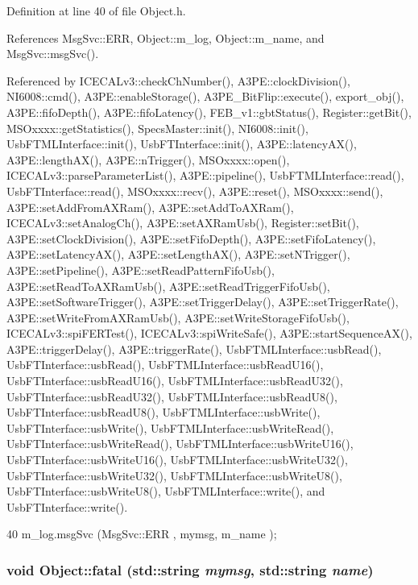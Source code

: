 Definition at line 40 of file Object.h.

References MsgSvc::ERR, Object::m\_\-log, Object::m\_\-name, and MsgSvc::msgSvc().

Referenced by ICECALv3::checkChNumber(), A3PE::clockDivision(), NI6008::cmd(), A3PE::enableStorage(), A3PE\_\-BitFlip::execute(), export\_\-obj(), A3PE::fifoDepth(), A3PE::fifoLatency(), FEB\_\-v1::gbtStatus(), Register::getBit(), MSOxxxx::getStatistics(), SpecsMaster::init(), NI6008::init(), UsbFTMLInterface::init(), UsbFTInterface::init(), A3PE::latencyAX(), A3PE::lengthAX(), A3PE::nTrigger(), MSOxxxx::open(), ICECALv3::parseParameterList(), A3PE::pipeline(), UsbFTMLInterface::read(), UsbFTInterface::read(), MSOxxxx::recv(), A3PE::reset(), MSOxxxx::send(), A3PE::setAddFromAXRam(), A3PE::setAddToAXRam(), ICECALv3::setAnalogCh(), A3PE::setAXRamUsb(), Register::setBit(), A3PE::setClockDivision(), A3PE::setFifoDepth(), A3PE::setFifoLatency(), A3PE::setLatencyAX(), A3PE::setLengthAX(), A3PE::setNTrigger(), A3PE::setPipeline(), A3PE::setReadPatternFifoUsb(), A3PE::setReadToAXRamUsb(), A3PE::setReadTriggerFifoUsb(), A3PE::setSoftwareTrigger(), A3PE::setTriggerDelay(), A3PE::setTriggerRate(), A3PE::setWriteFromAXRamUsb(), A3PE::setWriteStorageFifoUsb(), ICECALv3::spiFERTest(), ICECALv3::spiWriteSafe(), A3PE::startSequenceAX(), A3PE::triggerDelay(), A3PE::triggerRate(), UsbFTMLInterface::usbRead(), UsbFTInterface::usbRead(), UsbFTMLInterface::usbReadU16(), UsbFTInterface::usbReadU16(), UsbFTMLInterface::usbReadU32(), UsbFTInterface::usbReadU32(), UsbFTMLInterface::usbReadU8(), UsbFTInterface::usbReadU8(), UsbFTMLInterface::usbWrite(), UsbFTInterface::usbWrite(), UsbFTMLInterface::usbWriteRead(), UsbFTInterface::usbWriteRead(), UsbFTMLInterface::usbWriteU16(), UsbFTInterface::usbWriteU16(), UsbFTMLInterface::usbWriteU32(), UsbFTInterface::usbWriteU32(), UsbFTMLInterface::usbWriteU8(), UsbFTInterface::usbWriteU8(), UsbFTMLInterface::write(), and UsbFTInterface::write().


\begin{DoxyCode}
40 { m_log.msgSvc (MsgSvc::ERR     , mymsg, m_name ); }
\end{DoxyCode}
\hypertarget{classObject_ae62acd3d09f716220f75f252dc38bc9a}{
\subsubsection[{fatal}]{\setlength{\rightskip}{0pt plus 5cm}void Object::fatal (std::string {\em mymsg}, \/  std::string {\em name})}}
\label{classObject_ae62acd3d09f716220f75f252dc38bc9a}


